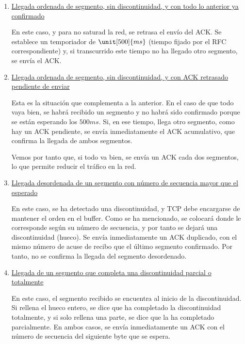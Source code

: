\begin{enumerate}
    \item \ul{Llegada ordenada de segmento, sin discontinuidad, y con todo lo anterior ya} \\ \ul{confirmado}
    
    En este caso, y para no saturad la red, se retrasa el envío del \acrshort{ACK}. Se establece un temporiador de $\unit[500]{ms}$ (tiempo fijado por el \acrshort{RFC} correspondiente) y, si transcurrido este tiempo no ha llegado otro segmento, se envía el \acrshort{ACK}.

    \item \ul{Llegada ordenada de segmento, sin discontinuidad, y con \acrshort{ACK} retrasado} \\ \ul{pendiente de enviar}
    
    Esta es la situación que complementa a la anterior. En el caso de que todo vaya bien, se habrá recibido un segmento y no habrá sido confirmado porque se están esperando los $\unit{500}{ms}$. Si, en ese tiempo, llega otro segmento, como hay un \acrshort{ACK} pendiente, se envía inmediatamente el \acrshort{ACK} acumulativo, que confirma la llegada de ambos segmentos.

    Vemos por tanto que, si todo va bien, se envía un \acrshort{ACK} cada dos segmentos, lo que permite reducir el tráfico en la red.
    \item \ul{Llegada desordenada de un segmento
    con número de secuencia mayor que el}\\\ul{esperado}

    En este caso, se ha detectado una discontinuidad, y \acrshort{TCP} debe encargarse de mantener el orden en el buffer. Como se ha mencionado, se colocará donde le corresponde según su número de secuencia, y por tanto se dejará una discontinuidad (hueco). Se envía inmediatamente un \acrshort{ACK} duplicado, con el mismo número de acuse de recibo que el último segmento confirmado. Por tanto, no se confirma la llegada del segmento desordenado.

    \item \ul{Llegada de un segmento que completa
    una discontinuidad parcial o totalmente}

    En este caso, el segmento recibido se encuentra al inicio de la discontinuidad. Si rellena el hueco entero, se dice que ha completado la discontinuidad totalmente, y si solo rellena una parte, se dice que la ha completado parcialmente. En ambos casos, se envía inmediatamente un \acrshort{ACK} con el número de secuencia del siguiente byte que se espera.
\end{enumerate}


